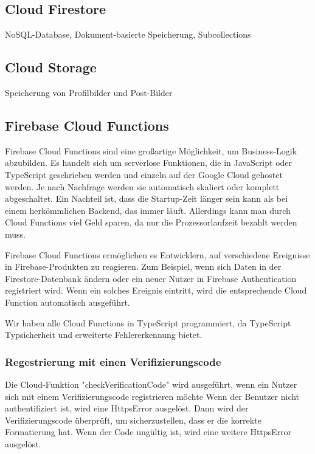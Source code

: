 \subsection{Cloud Firestore}
\author{Sandin Habibovic}
NoSQL-Database, Dokument-basierte Speicherung, Subcollections
\subsection{Cloud Storage}
\author{Sandin Habibovic}
Speicherung von Profilbilder und Post-Bilder
\subsection{Firebase Cloud Functions}
Firebase Cloud Functions sind eine großartige Möglichkeit,
um Business-Logik abzubilden. Es handelt sich um serverlose
Funktionen, die in JavaScript oder TypeScript geschrieben
werden und einzeln auf der Google Cloud gehostet werden. Je
nach Nachfrage werden sie automatisch skaliert oder komplett
abgeschaltet. Ein Nachteil ist, dass die Startup-Zeit länger
sein kann als bei einem herkömmlichen Backend, das immer
läuft. Allerdings kann man durch Cloud Functions viel Geld
sparen, da nur die Prozessorlaufzeit bezahlt werden muss.

Firebase Cloud Functions ermöglichen es Entwicklern, auf verschiedene Ereignisse in Firebase-Produkten zu reagieren. Zum Beispiel, wenn sich Daten in der Firestore-Datenbank ändern oder ein neuer Nutzer in Firebase Authentication registriert wird. Wenn ein solches Ereignis eintritt, wird die entsprechende Cloud Function automatisch ausgeführt.

Wir haben alle Cloud Functions in TypeScript programmiert,
da TypeScript Typsicherheit und erweiterte Fehlererkennung
bietet.


\subsubsection{Regestrierung mit einen Verifizierungscode}

Die Cloud-Funktion "checkVerificationCode" wird ausgeführt, wenn ein Nutzer sich mit einem Verifizierungscode registrieren möchte Wenn der Benutzer nicht authentifiziert ist, wird eine HttpsError ausgelöst. Dann wird der Verifizierungscode überprüft, um sicherzustellen, dass er die korrekte Formatierung hat. Wenn der Code ungültig ist, wird eine weitere HttpsError ausgelöst.

